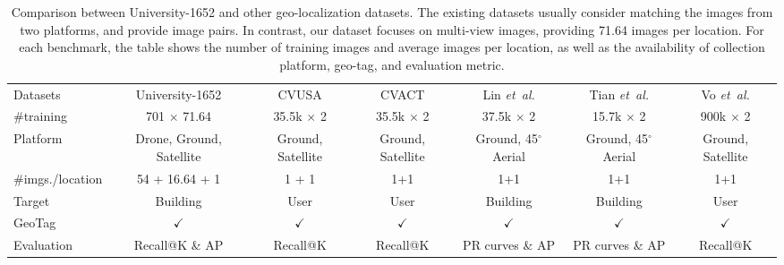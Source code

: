 \documentclass[sigconf]{acmart}
\def\etal{\emph{et~al.}}
\begin{document}
\setlength{\tabcolsep}{6pt}
\begin{table*}
\small
\begin{center}
\begin{tabular}{l|c|c|c|c|c|c}
\hline
Datasets & University-1652 & CVUSA \cite{zhai2017predicting} & CVACT \cite{liu2019lending}  & Lin \etal \cite{lin2015learning} & Tian \etal \cite{tian2017cross} & Vo \etal \cite{vo2016localizing}\\
\shline
\#training & 701 $\times$ 71.64 & 35.5k $\times$ 2 & 35.5k $\times$ 2 & 37.5k $\times$ 2 & 15.7k $\times$ 2 & 900k $\times$ 2 \\
Platform     & Drone, Ground, Satellite &  Ground, Satellite  &  Ground, Satellite & Ground, 45$^{\circ}$ Aerial & Ground, 45$^{\circ}$ Aerial & Ground, Satellite \\
\#imgs./location  &  54 + 16.64 + 1 &  1 + 1  & 1+1 & 1+1 &  1+1 &  1+1 \\
Target     & Building &  User &  User & Building & Building & User \\
GeoTag     & $\checkmark$  & $\checkmark$ &  $\checkmark$ &  $\checkmark$ & $\checkmark$ & $\checkmark$ \\
Evaluation  & Recall@K \& AP & Recall@K & Recall@K & PR curves \& AP & PR curves \& AP  & Recall@K \\
\hline
\end{tabular}
\end{center}
\caption{Comparison between University-1652 and other geo-localization datasets. The existing datasets usually consider matching the images from two platforms, and provide image pairs. In contrast, our dataset focuses on multi-view images, providing 71.64 images per location. 
For each benchmark, the table shows the number of training images and average images per location, as well as the availability of collection platform, geo-tag, and evaluation metric.
}
\vspace{-.2in}
\label{table:Dataset}
\end{table*}
\end{document}
